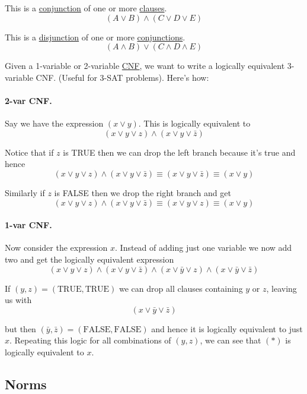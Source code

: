 \label{ab60bb1}

This is a \href{ba4e2fa}{conjunction} of one or more \href{ba4e2fa}{clauses}.
$$
  (A\lor B)\land (C\lor D\lor E)
$$

\label{bb41c04}

This is a \href{ba4e2fa}{disjunction} of one or more
\href{ba4e2fa}{conjunctions}.
$$
  (A\land B)\lor (C\land D\land E)
$$

\label{f33a84e}

Given a 1-variable or 2-variable \href{ab60bb1}{CNF}, we want to write a
logically equivalent 3-variable CNF. (Useful for 3-SAT problems). Here's how:

\paragraph{2-var CNF.} Say we have the expression $(x\lor y)$. This is logically equivalent to
$$
  (x\lor y\lor z)\land(x\lor y\lor\bar z)
$$

Notice that if $z$ is TRUE then we can drop the left branch because it's true
and hence
$$
  (x\lor y\lor z)\land(x\lor y\lor\bar z) \equiv(x\lor y\lor\bar z) \equiv (x\lor y)
$$

Similarly if $z$ is FALSE then we drop the right branch and get
$$
  (x\lor y\lor z)\land(x\lor y\lor\bar z) \equiv(x\lor y\lor z) \equiv (x\lor y)
$$

\paragraph{1-var CNF.} Now consider the expression $x$. Instead of adding just one variable we now add
two and get the logically equivalent expression
\begin{equation*}
  (x\lor y\lor z)\land
  (x\lor y\lor\bar z)\land
  (x\lor \bar y\lor z)\land
  (x\lor \bar y\lor\bar z)
\end{equation*}

If $(y,z)=(\text{TRUE},\text{TRUE})$ we can drop all clauses containing $y$ or
$z$, leaving us with
$$
  (x\lor \bar y\lor\bar z)
$$

but then $(\bar y,\bar z)=(\text{FALSE},\text{FALSE})$ and hence it is
logically equivalent to just $x$. Repeating this logic for all combinations of
$(y,z)$, we can see that $(*)$ is logically equivalent to $x$.

\subsection{Norms}\label{c102004}

